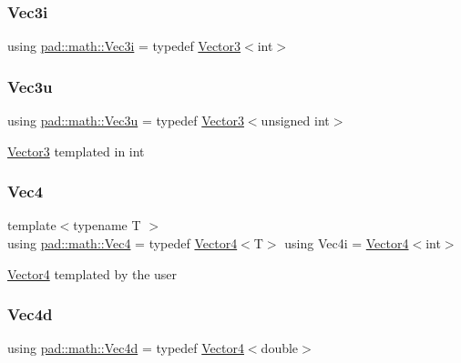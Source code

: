 \subsubsection{\texorpdfstring{Vec3i}{Vec3i}}
{\footnotesize\ttfamily using \mbox{\hyperlink{namespacepad_1_1math_acccfc4afcdb1f72c6881e0e74078eb7b}{pad\+::math\+::\+Vec3i}} = typedef \mbox{\hyperlink{structpad_1_1math_1_1_vector3}{Vector3}}$<$int$>$}

\mbox{\label{namespacepad_1_1math_ad75d374d51ed67887ddde9d2111e69fd}} 
\subsubsection{\texorpdfstring{Vec3u}{Vec3u}}
{\footnotesize\ttfamily using \mbox{\hyperlink{namespacepad_1_1math_ad75d374d51ed67887ddde9d2111e69fd}{pad\+::math\+::\+Vec3u}} = typedef \mbox{\hyperlink{structpad_1_1math_1_1_vector3}{Vector3}}$<$unsigned int$>$}

\mbox{\hyperlink{structpad_1_1math_1_1_vector3}{Vector3}} templated in int \mbox{\label{namespacepad_1_1math_a60dc33698b324ca795bfef17a678b368}} 
\subsubsection{\texorpdfstring{Vec4}{Vec4}}
{\footnotesize\ttfamily template$<$typename T $>$ \\
using \mbox{\hyperlink{namespacepad_1_1math_a60dc33698b324ca795bfef17a678b368}{pad\+::math\+::\+Vec4}} = typedef \mbox{\hyperlink{structpad_1_1math_1_1_vector4}{Vector4}}$<$T$>$ using Vec4i = \mbox{\hyperlink{structpad_1_1math_1_1_vector4}{Vector4}}$<$int$>$}

\mbox{\hyperlink{structpad_1_1math_1_1_vector4}{Vector4}} templated by the user \mbox{\label{namespacepad_1_1math_a845efb6de5d2237d1a7f27cf87741454}} 
\subsubsection{\texorpdfstring{Vec4d}{Vec4d}}
{\footnotesize\ttfamily using \mbox{\hyperlink{namespacepad_1_1math_a845efb6de5d2237d1a7f27cf87741454}{pad\+::math\+::\+Vec4d}} = typedef \mbox{\hyperlink{structpad_1_1math_1_1_vector4}{Vector4}}$<$double$>$}

